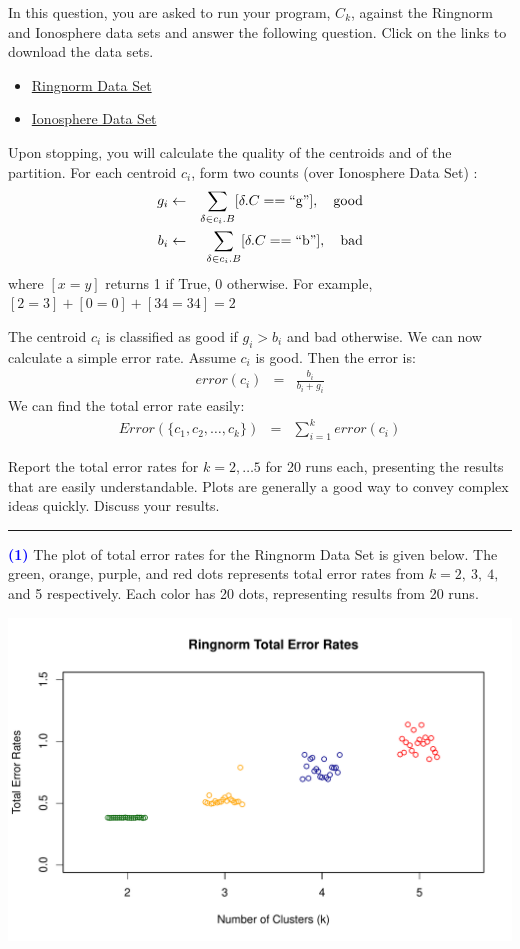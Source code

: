 \documentclass[a4paper,11pt]{article}
\newcommand{\quotes}[1]{``#1''}
\newcommand{\qnum}[1]{\noindent\textcolor{blue}{\textbf{(#1)}}}
\newcommand{\sep}{\begin{center}\textcolor{gray}{\rule{\textwidth}{0.75pt}}\end{center}}
\begin{document}
 In this question, you are asked to run  your program, $C_k$, against the Ringnorm and Ionosphere data sets and answer the following question. Click on the links to download the data sets.
 \begin{itemize}
 \item  \href{http://mldata.org/repository/data/viewslug/ringnorm-ida/}{Ringnorm Data Set}
 \item  \href{https://archive.ics.uci.edu/ml/datasets/ionosphere}{
Ionosphere Data Set }
 \end{itemize}
 
 
 
  Upon stopping, you will calculate the quality of the centroids and of the partition.  For each centroid $c_i$, form two counts (over Ionosphere Data Set)  :
  \begin{eqnarray*}
  g_i &\gets& \sum_{\delta \in c_i.B} [\delta.C ==\text{\quotes{g}}],\ \ \ \mbox{\rm good}\\
  b_i &\gets& \sum_{\delta \in c_i.B} [\delta.C = =\text{\quotes{b}}], \ \ \ \mbox{\rm bad}
  \end{eqnarray*}
  where $[x = y]$ returns 1 if True, 0 otherwise.  For example, $[2 = 3] + [0 = 0] + [34 = 34] = 2$
  
  The centroid $c_i$ is classified as good if $g_i > b_i$ and bad otherwise.  We can now calculate a simple error rate.    Assume $c_i$ is good.  Then the error is:
 \begin{eqnarray*}
 error(c_i) &=& \frac{b_i}{b_i + g_i}
 \end{eqnarray*}
 We can find the total error rate easily:
 \begin{eqnarray*}
 Error(\{c_1, c_2, \ldots, c_k\}) &=& \sum_{i=1}^k error(c_i)
 \end{eqnarray*}

Report the total error rates for $k = 2,\ldots 5$ for 20 runs each, presenting the results that are easily understandable.  Plots are generally a good way to convey complex ideas quickly. Discuss  your results.
\sep 


\qnum{1} 
The plot of total error rates for the Ringnorm Data Set is given below.
The green, orange, purple, and red dots represents total error rates from $k = 2,\ 3,\ 4, $ and 5 respectively. Each color has 20 dots, representing results from 20 runs.

\begin{center}
  \includegraphics[width=0.9\linewidth]{Image/Prob4-ring.pdf}
\end{center}
\end{document}
